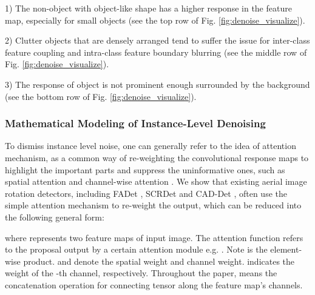\documentclass[10pt,journal,compsoc]{IEEEtran}
\begin{document}
1) The non-object with object-like shape has a higher response in the feature map, especially for small objects (see the top row of Fig. \ref{fig:denoise_visualize}).

2) Clutter objects that are densely arranged tend to suffer the issue for inter-class feature coupling and intra-class feature boundary blurring (see the middle row of Fig. \ref{fig:denoise_visualize}).

3) The response of object is not prominent enough surrounded by the background (see the bottom row of Fig. \ref{fig:denoise_visualize}).

\subsubsection{Mathematical Modeling of Instance-Level Denoising}
\label{sec:inld_fundamental}
To dismiss instance level noise, one can generally refer to the idea of attention mechanism, as a common way of re-weighting the convolutional response maps to highlight the important parts and suppress the uninformative ones, such as spatial attention \cite{wang2018non} and channel-wise attention \cite{hu2018squeeze}. We show that existing aerial image rotation detectors, including FADet \cite{li2019feature}, SCRDet \cite{yang2019scrdet} and CAD-Det \cite{zhang2019cad}, often use the simple attention mechanism to re-weight the output, which can be reduced into the following general form:

where  represents two feature maps of input image. The attention function  refers to the proposal output by a certain attention module e.g. \cite{wang2018non, hu2018squeeze}. Note  is the element-wise product.  and  denote the spatial weight and channel weight.  indicates the weight of the -th channel, respectively. Throughout the paper,  means the concatenation operation for connecting tensor along the feature map's channels.
\end{document}
